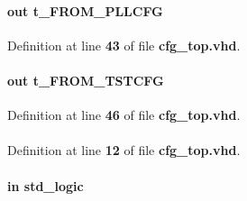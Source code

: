 \paragraph[{from\+\_\+pllcfg}]{ {\bfseries \textcolor{keywordflow}{out}\textcolor{vhdlchar}{ }} {\bfseries {\bfseries {\bf t\+\_\+\+F\+R\+O\+M\+\_\+\+P\+L\+L\+C\+FG}} \textcolor{vhdlchar}{ }} \hspace{0.3cm}{\ttfamily [Port]}}\label{classcfg__top_afca863441530a97a044cbfd5e3e4ed88}


Definition at line {\bf 43} of file {\bf cfg\+\_\+top.\+vhd}.

\paragraph[{from\+\_\+tstcfg}]{ {\bfseries \textcolor{keywordflow}{out}\textcolor{vhdlchar}{ }} {\bfseries {\bfseries {\bf t\+\_\+\+F\+R\+O\+M\+\_\+\+T\+S\+T\+C\+FG}} \textcolor{vhdlchar}{ }} \hspace{0.3cm}{\ttfamily [Port]}}\label{classcfg__top_afca9b5ec78444ed22c64dcca455bf460}


Definition at line {\bf 46} of file {\bf cfg\+\_\+top.\+vhd}.

\paragraph[{ieee}]{\hspace{0.3cm}{\ttfamily [Library]}}\label{classcfg__top_a0a6af6eef40212dbaf130d57ce711256}


Definition at line {\bf 12} of file {\bf cfg\+\_\+top.\+vhd}.

\paragraph[{lreset}]{ {\bfseries \textcolor{keywordflow}{in}\textcolor{vhdlchar}{ }} {\bfseries \textcolor{comment}{std\+\_\+logic}\textcolor{vhdlchar}{ }} \hspace{0.3cm}{\ttfamily [Port]}}\label{classcfg__top_ab4573fdea1cdc3308c947af523ca0d97}


